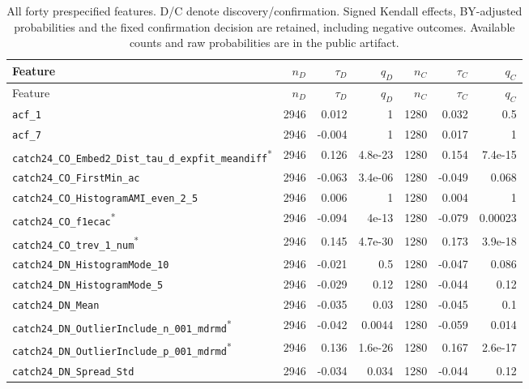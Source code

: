 \begingroup\footnotesize\setlength{\tabcolsep}{3pt}
\begin{longtable}{p{}rrrrrr}
\caption{All forty prespecified features. D/C denote discovery/confirmation. Signed Kendall effects, BY-adjusted probabilities and the fixed confirmation decision are retained, including negative outcomes. Available counts and raw probabilities are in the public artifact.}\label{tab:corpus-associations}\\
\toprule Feature & $n_D$ & $\tau_D$ & $q_D$ & $n_C$ & $\tau_C$ & $q_C$\\\midrule\endfirsthead
\toprule Feature & $n_D$ & $\tau_D$ & $q_D$ & $n_C$ & $\tau_C$ & $q_C$\\\midrule\endhead
\raggedright \nolinkurl{acf_1} & 2946 & 0.012 & 1 & 1280 & 0.032 & 0.5 \\
\raggedright \nolinkurl{acf_7} & 2946 & -0.004 & 1 & 1280 & 0.017 & 1 \\
\raggedright \nolinkurl{catch24_CO_Embed2_Dist_tau_d_expfit_meandiff}\textsuperscript{*} & 2946 & 0.126 & 4.8e-23 & 1280 & 0.154 & 7.4e-15 \\
\raggedright \nolinkurl{catch24_CO_FirstMin_ac} & 2946 & -0.063 & 3.4e-06 & 1280 & -0.049 & 0.068 \\
\raggedright \nolinkurl{catch24_CO_HistogramAMI_even_2_5} & 2946 & 0.006 & 1 & 1280 & 0.004 & 1 \\
\raggedright \nolinkurl{catch24_CO_f1ecac}\textsuperscript{*} & 2946 & -0.094 & 4e-13 & 1280 & -0.079 & 0.00023 \\
\raggedright \nolinkurl{catch24_CO_trev_1_num}\textsuperscript{*} & 2946 & 0.145 & 4.7e-30 & 1280 & 0.173 & 3.9e-18 \\
\raggedright \nolinkurl{catch24_DN_HistogramMode_10} & 2946 & -0.021 & 0.5 & 1280 & -0.047 & 0.086 \\
\raggedright \nolinkurl{catch24_DN_HistogramMode_5} & 2946 & -0.029 & 0.12 & 1280 & -0.044 & 0.12 \\
\raggedright \nolinkurl{catch24_DN_Mean} & 2946 & -0.035 & 0.03 & 1280 & -0.045 & 0.1 \\
\raggedright \nolinkurl{catch24_DN_OutlierInclude_n_001_mdrmd}\textsuperscript{*} & 2946 & -0.042 & 0.0044 & 1280 & -0.059 & 0.014 \\
\raggedright \nolinkurl{catch24_DN_OutlierInclude_p_001_mdrmd}\textsuperscript{*} & 2946 & 0.136 & 1.6e-26 & 1280 & 0.167 & 2.6e-17 \\
\raggedright \nolinkurl{catch24_DN_Spread_Std} & 2946 & -0.034 & 0.034 & 1280 & -0.044 & 0.12 \\

\end{longtable}
